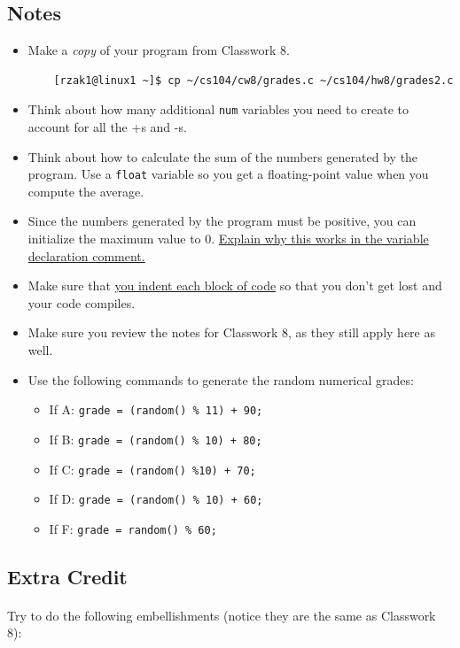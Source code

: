 \documentclass[letter,11pt]{article}
\begin{document}
\subsection*{Notes}
\begin{itemize}
    \item Make a \textit{copy} of your program from Classwork 8.
    \begin{verbatim}
    [rzak1@linux1 ~]$ cp ~/cs104/cw8/grades.c ~/cs104/hw8/grades2.c   
    \end{verbatim}
    \item Think about how many additional \texttt{num} variables you need to create to account for all the +s and -s.
    \item Think about how to calculate the sum of the numbers generated by the program. Use a \texttt{float} variable so you get a floating-point value when you compute the average.
    \item Since the numbers generated by the program must be positive, you can initialize the maximum value to 0. \underline{Explain why this works in the variable declaration comment.}
    \item Make sure that \underline{you indent each block of code} so that you don't get lost and your code compiles.
    \item Make sure you review the notes for Classwork 8, as they still apply here as well.
    \item Use the following commands to generate the random numerical grades:
    \begin{itemize}
        \item If A: \texttt{grade = (random() \% 11) + 90;}
        \item If B: \texttt{grade = (random() \% 10) + 80;}
        \item If C: \texttt{grade = (random() \%10) + 70;}
        \item If D: \texttt{grade = (random() \% 10) + 60;}
        \item If F: \texttt{grade = random() \% 60;}
    \end{itemize}
\end{itemize}

\subsection*{Extra Credit}
\paragraph{}Try to do the following embellishments (notice they are the same as Classwork 8):
\end{document}
